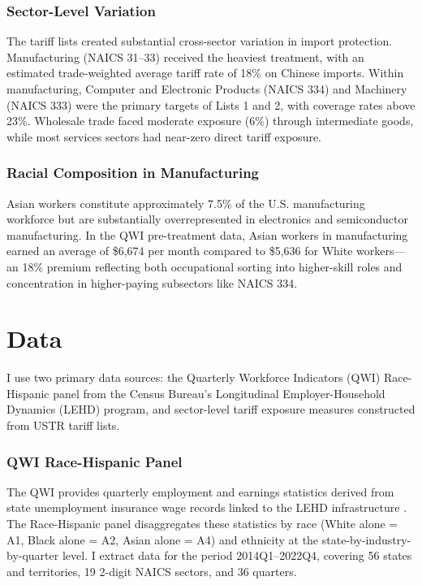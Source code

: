 \documentclass[12pt]{article}
\begin{document}
\subsubsection*{Sector-Level Variation} The tariff lists created substantial cross-sector variation in import protection. Manufacturing (NAICS 31--33) received the heaviest treatment, with an estimated trade-weighted average tariff rate of 18\% on Chinese imports. Within manufacturing, Computer and Electronic Products (NAICS 334) and Machinery (NAICS 333) were the primary targets of Lists 1 and 2, with coverage rates above 23\%. Wholesale trade faced moderate exposure (6\%) through intermediate goods, while most services sectors had near-zero direct tariff exposure.

\subsubsection*{Racial Composition in Manufacturing} Asian workers constitute approximately 7.5\% of the U.S. manufacturing workforce but are substantially overrepresented in electronics and semiconductor manufacturing. In the QWI pre-treatment data, Asian workers in manufacturing earned an average of \$6,674 per month compared to \$5,636 for White workers---an 18\% premium reflecting both occupational sorting into higher-skill roles and concentration in higher-paying subsectors like NAICS 334.

\section{Data}

I use two primary data sources: the Quarterly Workforce Indicators (QWI) Race-Hispanic panel from the Census Bureau's Longitudinal Employer-Household Dynamics (LEHD) program, and sector-level tariff exposure measures constructed from USTR tariff lists.

\subsubsection*{QWI Race-Hispanic Panel} The QWI provides quarterly employment and earnings statistics derived from state unemployment insurance wage records linked to the LEHD infrastructure \citep{abowd2009lehd}. The Race-Hispanic panel disaggregates these statistics by race (White alone = A1, Black alone = A2, Asian alone = A4) and ethnicity at the state-by-industry-by-quarter level. I extract data for the period 2014Q1--2022Q4, covering 56 states and territories, 19 2-digit NAICS sectors, and 36 quarters.
\end{document}
